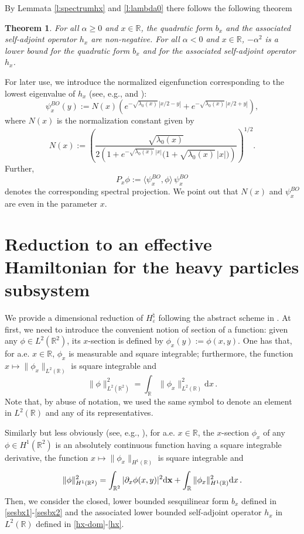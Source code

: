 \documentclass[a4paper,11pt,reqno]{amsart}
\newtheorem{theorem}{Theorem}[section]
\theoremstyle{definition}
\numberwithin{equation}{section}
\newcommand{\RE}{\mathbb R}
\newcommand{\ve}{\varepsilon}
\renewcommand{\d}{\mathrm{d}}
\newcommand{\x}{{\bf  x}}
\newcommand{\bosfer}{{\natural}}
\begin{document}
By Lemmata \ref{l:spectrumhx} and  \ref{l:lambda0} there follows the following theorem
\begin{theorem}\label{th:lowerboundbH} 
For all $\alpha\geq 0$ and $x\in\RE$, the quadratic form $b_x$ and the associated self-adjoint operator $h_x$ are non-negative. For all $\alpha<0$ and $x\in\RE$, $-\alpha^2$ is a lower bound for the quadratic form $b_x$ and for the associated self-adjoint operator $h_x$. 
\end{theorem}
For later use, we introduce the  normalized eigenfunction corresponding to the lowest eigenvalue of $h_x$ (see, e.g.,  \cite{AGHKH05} and \cite{AT1}):  
\begin{equation}\label{psiBOx}
 \psi^{BO}_{x}(y) :=    N(x) 
\left(e^{-\sqrt{\lambda_{0}(x)}\,|x/2-y|} + e^{-\sqrt{\lambda_{0}(x)}\,|x/2+y|}\right) ,
\end{equation}
where $N(x)$ is the normalization constant  given by 
 \begin{equation}\label{Normalization_constant}
        N(x)  := \left(\frac{\sqrt{\lambda_{0}(x)}}{2\left(1+ e^{-\sqrt{\lambda_{0}(x)}\,|x|}\big(1+ \sqrt{\lambda_{0}(x)}\,|x|\big)\right)} \right)^{1/2} .
    \end{equation}
    Further,
    \begin{equation}\label{Px}
   {P}_x\phi:= \langle\psi^{BO}_x, \phi\rangle\,\psi^{BO}_x
    \end{equation}
    denotes the corresponding spectral projection. 
We point out that $N(x)$ and $\psi^{BO}_x$ are even in the parameter $x$. 




\section{Reduction to an effective Hamiltonian for the heavy particles subsystem\label{s:reduction}}

We provide a dimensional reduction of $H^\bosfer_\ve$ following the abstract scheme in \cite{Krejcirik-etal-m2018}. At first, we need to introduce the convenient notion of section of a function: given any $\phi\in L^{2}(\RE^{2})$,  its $x$-section is defined by $\phi_x(y):= \phi(x,y)$. One has that, for a.e. $x\in \RE$, $\phi_x$ is measurable and square integrable;  furthermore,  the function $x\mapsto \|\phi_x\|_{L^2(\RE)}$ is square integrable and
\[
\|\phi\|^{2}_{L^2(\RE^2)} =\int_{\RE} \|\phi_{x}\|_{L^2(\RE)}^2 \d x\,.
\]
Note that, by abuse of notation, we used the same symbol to denote an element in $L^{2}(\RE)$ and any of its representatives.\par
Similarly but less obviously (see, e.g., \cite[Section 5.6]{KJF}),  for a.e. $x\in \RE$, the $x$-section $\phi_x$ of  any $\phi\in H^1(\RE^2)$ is an absolutely continuous function having a square integrable derivative, the function  $x\mapsto \|\phi_x\|_{H^1(\RE)}$ is square integrable and 
\[
\|\phi\|^{2}_{H^1(\RE^2)} =\int_{\RE^2} |\partial_x \phi(x,y)|^2 \d\x + \int_\RE \|\phi_{x}\|_{H^1(\RE)}^2 \d x\,.
\]
Then, we consider the closed, lower bounded  sesquilinear   form $b_x$ defined in \eqref{sesbx1}-\eqref{sesbx2} and the associated  lower bounded self-adjoint operator $h_x$ in  $L^2(\RE)$ defined in \eqref{hx-dom}-\eqref{hx}. 
\end{document}
